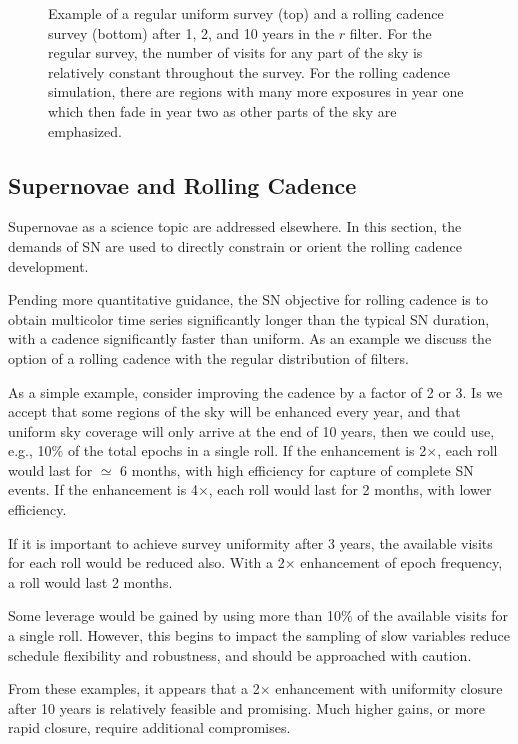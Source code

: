 \begin{figure}
  \caption{Example of a regular uniform survey (top) and a rolling cadence survey (bottom) after 1, 2, and 10 years in the $r$ filter.  For the regular survey, the number of visits for any part of the sky is relatively constant throughout the survey.  For the rolling cadence simulation, there are regions with many more exposures in year one which then fade in year two as other parts of the sky are emphasized.\label{fig:rollingcadence}}
\end{figure}


\subsection{Supernovae and Rolling Cadence}
\label{sec:rolling:supernovae}


Supernovae as a science topic are addressed elsewhere.
In this section, the demands of SN are used to directly constrain or
orient the rolling cadence development.

Pending more quantitative guidance, the SN objective for rolling cadence
is to obtain multicolor time series significantly longer than the
typical SN duration, with a cadence significantly faster than uniform.
As an example we discuss the option of a rolling cadence with the
regular distribution of filters.

As a simple example, consider improving the cadence by a factor of 2 or
3.  Is we accept that some regions of the sky will be enhanced every
year, and that uniform sky coverage will only arrive at the end of 10
years, then we could use, e.g., 10\% of the total epochs in a single
roll.  If the enhancement is 2$\times$, each roll would last for
$\simeq$ 6 months, with high efficiency for capture of complete SN
events.  If the enhancement is 4$\times$, each roll would last for 2
months, with lower efficiency.

If it is important to achieve survey uniformity after 3 years, the
available visits for each roll would be reduced also.  With a 2$\times$
enhancement of epoch frequency, a roll would last 2 months.

Some leverage would be gained by using more than 10\% of the available
visits for a single roll.  However, this begins to impact the sampling
of slow variables reduce schedule flexibility and robustness, and should
be approached with caution.

From these examples, it appears that a 2$\times$ enhancement with
uniformity closure after 10 years is relatively feasible and promising.
Much higher gains, or more rapid closure, require additional
compromises.

